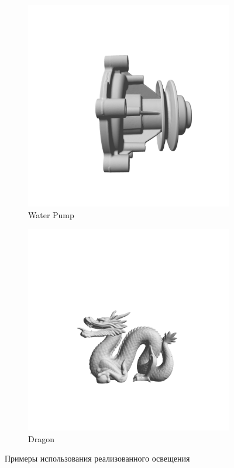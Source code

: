 \documentclass[a4paper,hidelinks,12pt]{article}
\begin{document}
\begin{figure}[ht]
\begin{subfigure}[b]{0.3\textwidth}
			\includegraphics[width=\textwidth]{waterpump.png}
			\caption{Water Pump}
			\label{fig:img2}
	\end{subfigure}
	\hfill
	\begin{subfigure}[b]{0.3\textwidth}
			\includegraphics[width=\textwidth]{dragon.png}
			\caption{Dragon}
			\label{fig:img3}
	\end{subfigure}
	\caption{Примеры использования реализованного освещения}
	\label{fig:three-in-row}
\end{figure}
\end{document}
